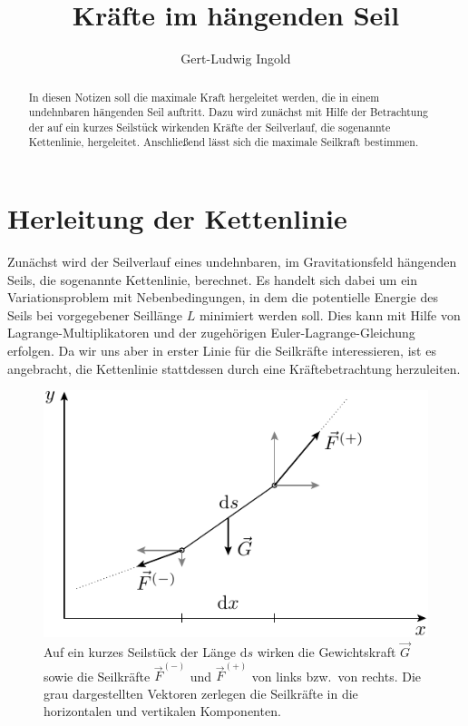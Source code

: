 \documentclass[twocolumn,aps]{revtex4}
\begin{document}
\title{Kräfte im hängenden Seil}
\author{Gert-Ludwig Ingold}
\begin{abstract}
  In diesen Notizen soll die maximale Kraft hergeleitet werden, die in einem
  undehnbaren hängenden Seil auftritt. Dazu wird zunächst mit Hilfe der 
  Betrachtung der auf ein kurzes Seilstück wirkenden Kräfte der Seilverlauf,
  die sogenannte Kettenlinie, hergeleitet. Anschließend lässt sich die maximale
  Seilkraft bestimmen.
\end{abstract}
\maketitle

\section{Herleitung der Kettenlinie}
Zunächst wird der Seilverlauf eines undehnbaren, im Gravitationsfeld hängenden
Seils, die sogenannte Kettenlinie, berechnet. Es handelt sich dabei um ein
Variationsproblem mit Nebenbedingungen, in dem die potentielle Energie des
Seils bei vorgegebener Seillänge $L$ minimiert werden soll. Dies kann mit 
Hilfe von Lagrange-Multiplikatoren und der zugehörigen Euler-Lagrange-Gleichung
erfolgen. Da wir uns aber in erster Linie für die Seilkräfte interessieren,
ist es angebracht, die Kettenlinie stattdessen durch eine Kräftebetrachtung
herzuleiten.

\begin{figure}
 \includegraphics[width=0.8\columnwidth]{kraefte}
 \caption{Auf ein kurzes Seilstück der Länge $\mathrm{d}s$ wirken
	  die Gewichtskraft $\vec G$ sowie die Seilkräfte $\vec F^{(-)}$
	  und $\vec F^{(+)}$ von links bzw.\ von rechts. Die grau
	  dargestellten Vektoren zerlegen die Seilkräfte in die
	  horizontalen und vertikalen Komponenten.}
\end{figure}
\end{document}
